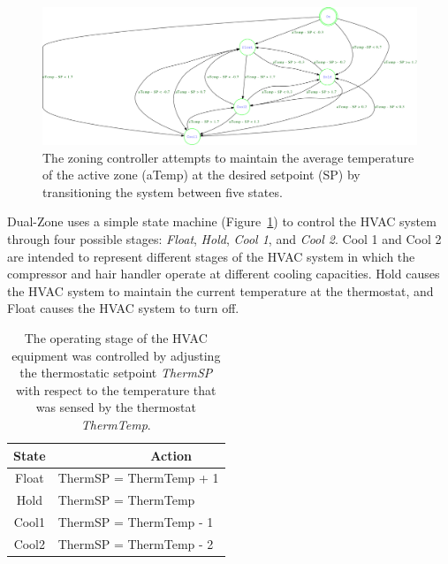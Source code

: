 \begin{figure}[!htb]
  \centering
  \includegraphics[width=1.0\columnwidth]{fig/fsm.eps}
  \caption[Finite State Machine of Dual-Zone Controller]{The
  zoning controller attempts to maintain the average temperature of the active
  zone (aTemp) at the desired setpoint (SP) by transitioning the system between
  five states.}
  \label{fig:stateMachine}
\end{figure}

Dual-Zone uses a simple state machine (Figure~\ref{fig:stateMachine}) to
control the HVAC system through four possible stages: {\em Float}, {\em Hold},
{\em Cool 1}, and {\em Cool 2}. Cool 1 and Cool 2 are intended to represent
different stages of the HVAC system in which the compressor and hair handler
operate at different cooling capacities.  Hold causes the HVAC system to
maintain the current temperature at the thermostat, and Float causes the HVAC
system to turn off.

\begin{table}[htp]
  \centering
  \begin{tabular}{|c|l|}
    \hline
    \small State & \small ~~~~~~~~~~~~~Action\\
    \hline
    \small Float & \small ThermSP = ThermTemp + 1 \\
    \small Hold & \small ThermSP = ThermTemp \\
    \small Cool1 & \small ThermSP = ThermTemp - 1 \\
    \small Cool2 & \small ThermSP = ThermTemp - 2 \\
    \hline
  \end{tabular}
  \caption[Coarse-grained abstraction for thermostat operation]{The operating stage of the HVAC equipment was controlled by adjusting the thermostatic setpoint {\em
  ThermSP} with respect to the temperature that was sensed by the thermostat {\em ThermTemp}.}
  \label{table:abstraction}
\end{table}

